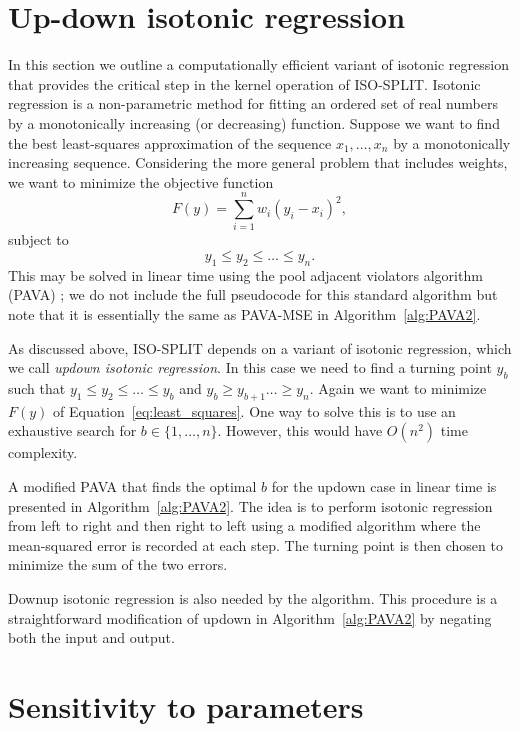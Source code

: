 \documentclass[10pt]{article}
\begin{document}
\section {Up-down isotonic regression}
\label{appendixUpdown}

In this section we outline a computationally efficient variant of isotonic regression that provides the critical step in the kernel operation of ISO-SPLIT. Isotonic regression is a non-parametric method for fitting an ordered set of real numbers by a monotonically increasing (or decreasing) function. Suppose we want to find the best least-squares approximation of the sequence $x_1,\dots,x_n$ by a monotonically increasing sequence. Considering the more general problem that includes weights, we want to minimize the objective function
\begin{equation}
F(y)=\sum_{i=1}^n w_i(y_i-x_i)^2,
\label{eq:least_squares}
\end{equation}
subject to
$$y_1\leq y_2\leq\dots\leq y_n.$$
This may be solved in linear time using the pool adjacent violators algorithm (PAVA) \citep{pava}; we do not include the full pseudocode for this standard algorithm but note that it is essentially the same as PAVA-MSE in Algorithm~\ref{alg:PAVA2}.

As discussed above, ISO-SPLIT depends on a variant of isotonic regression, which we call \emph{updown isotonic regression}. In this case we need to find a turning point $y_b$ such that $y_1\leq y_2\leq\dots\leq y_b$ and $y_b\geq y_{b+1}\dots\geq y_n$. Again we want to minimize $F(y)$ of Equation~\eqref{eq:least_squares}. One way to solve this is to use an exhaustive search for $b\in\{1,\dots,n\}$. However, this would have $O(n^2)$ time complexity.

A modified PAVA that finds the optimal $b$ for the updown case in linear time is presented in Algorithm~\ref{alg:PAVA2}. The idea is to perform isotonic regression from left to right and then right to left using a modified algorithm where the mean-squared error is recorded at each step. The turning point is then chosen to minimize the sum of the two errors.

Downup isotonic regression is also needed by the algorithm. This procedure is a straightforward modification of updown in Algorithm~\ref{alg:PAVA2} by negating both the input and output.

\section {Sensitivity to parameters}
\label{appendixSensitivity}
\end{document}
